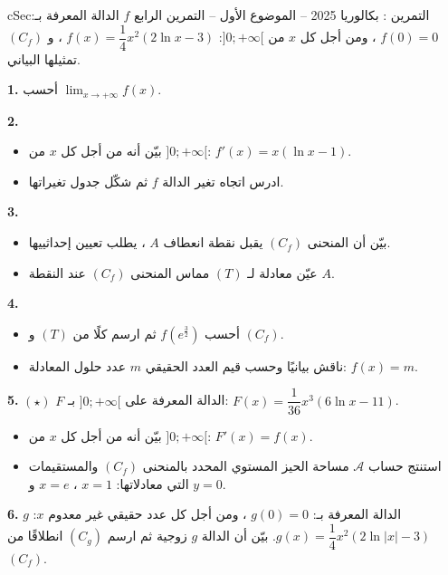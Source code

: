 \documentclass[12pt,a4paper]{article}
\newenvironment{BOX}[2]{\begin{otherlanguage}{english}\begin{arbox}{#1}{#2}}{\end{arbox}\end{otherlanguage}}
\newcounter{exo}
\newenvironment{tamrin}[1]{\stepcounter{exo}\begin{BOX}{cSec}{التمرين \theexo: #1}}{\end{BOX}}
\newenvironment{sq}{\begin{itemize}[leftmargin=2.4em,itemsep=3pt]}{\end{itemize}}
\newcommand{\qa}{\item[(أ)]}\newcommand{\qb}{\item[(ب)]}\newcommand{\qc}{\item[(جـ)]}\newcommand{\qd}{\item[(د)]}\newcommand{\qe}{\item[(هـ)]}
\newcommand{\QQ}[1]{\par\smallskip\textbf{#1.} }
\newcommand{\Lm}[1]{\displaystyle\lim_{x\to#1}}
\begin{document}
\begin{tamrin}{بكالوريا 2025 -- الموضوع الأول -- التمرين الرابع}
$f$ الدالة المعرفة بـ: $f(0)=0$ ، ومن أجل كل $x$ من $]0;+\infty[$: $f(x)=\dfrac14x^2(2\ln x-3)$ ، و $(C_f)$ تمثيلها البياني.
\QQ{1} أحسب $\Lm{+\infty}f(x)$.
\QQ{2}
\begin{sq}
\qa بيّن أنه من أجل كل $x$ من $]0;+\infty[$: $f'(x)=x(\ln x-1)$.
\qb ادرس اتجاه تغير الدالة $f$ ثم شكّل جدول تغيراتها.
\end{sq}
\QQ{3}
\begin{sq}
\qa بيّن أن المنحنى $(C_f)$ يقبل نقطة انعطاف $A$ ، يطلب تعيين إحداثييها.
\qb عيّن معادلة لـ $(T)$ مماس المنحنى $(C_f)$ عند النقطة $A$.
\end{sq}
\QQ{4}
\begin{sq}
\qa أحسب $f\left(e^{\frac32}\right)$ ثم ارسم كلًا من $(T)$ و $(C_f)$.
\qb ناقش بيانيًا وحسب قيم العدد الحقيقي $m$ عدد حلول المعادلة: $f(x)=m$.
\end{sq}
\QQ{5} $(\star)$ $F$ الدالة المعرفة على $]0;+\infty[$ بـ: $F(x)=\dfrac1{36}x^3(6\ln x-11)$.
\begin{sq}
\qa بيّن أنه من أجل كل $x$ من $]0;+\infty[$: $F'(x)=f(x)$.
\qb استنتج حساب $\mathcal A$ مساحة الحيز المستوي المحدد بالمنحنى $(C_f)$ والمستقيمات التي معادلاتها: $x=1$ ، $x=e$ و $y=0$.
\end{sq}
\QQ{6} $g$ الدالة المعرفة بـ: $g(0)=0$ ، ومن أجل كل عدد حقيقي غير معدوم $x$: $g(x)=\dfrac14x^2(2\ln|x|-3)$. بيّن أن الدالة $g$ زوجية ثم ارسم $(C_g)$ انطلاقًا من $(C_f)$.
\end{tamrin}
\end{document}
